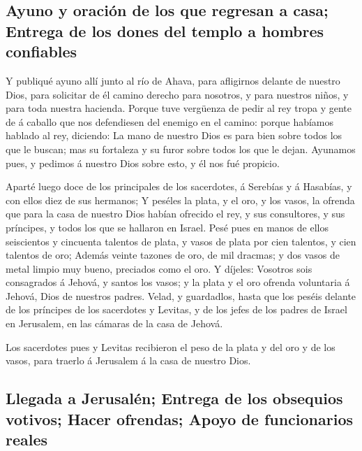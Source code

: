\hypertarget{ayuno-y-oraciuxf3n-de-los-que-regresan-a-casa-entrega-de-los-dones-del-templo-a-hombres-confiables}{%
\subsection{Ayuno y oración de los que regresan a casa; Entrega de los
dones del templo a hombres
confiables}\label{ayuno-y-oraciuxf3n-de-los-que-regresan-a-casa-entrega-de-los-dones-del-templo-a-hombres-confiables}}

 Y publiqué ayuno allí junto al río de Ahava, para
afligirnos delante de nuestro Dios, para solicitar de él camino derecho
para nosotros, y para nuestros niños, y para toda nuestra hacienda.
 Porque tuve vergüenza de pedir al rey tropa y gente de á
caballo que nos defendiesen del enemigo en el camino: porque habíamos
hablado al rey, diciendo: La mano de nuestro Dios es para bien sobre
todos los que le buscan; mas su fortaleza y su furor sobre todos los que
le dejan.  Ayunamos pues, y pedimos á nuestro Dios sobre
esto, y él nos fué propicio.

 Aparté luego doce de los principales de los sacerdotes,
á Serebías y á Hasabías, y con ellos diez de sus hermanos;
 Y peséles la plata, y el oro, y los vasos, la ofrenda
que para la casa de nuestro Dios habían ofrecido el rey, y sus
consultores, y sus príncipes, y todos los que se hallaron en Israel.
 Pesé pues en manos de ellos seiscientos y cincuenta
talentos de plata, y vasos de plata por cien talentos, y cien talentos
de oro;  Además veinte tazones de oro, de mil dracmas; y
dos vasos de metal limpio muy bueno, preciados como el oro.
 Y díjeles: Vosotros sois consagrados á Jehová, y santos
los vasos; y la plata y el oro ofrenda voluntaria á Jehová, Dios de
nuestros padres.  Velad, y guardadlos, hasta que los
peséis delante de los príncipes de los sacerdotes y Levitas, y de los
jefes de los padres de Israel en Jerusalem, en las cámaras de la casa de
Jehová.

 Los sacerdotes pues y Levitas recibieron el peso de la
plata y del oro y de los vasos, para traerlo á Jerusalem á la casa de
nuestro Dios.

\hypertarget{llegada-a-jerusaluxe9n-entrega-de-los-obsequios-votivos-hacer-ofrendas-apoyo-de-funcionarios-reales}{%
\subsection{Llegada a Jerusalén; Entrega de los obsequios votivos; Hacer
ofrendas; Apoyo de funcionarios
reales}\label{llegada-a-jerusaluxe9n-entrega-de-los-obsequios-votivos-hacer-ofrendas-apoyo-de-funcionarios-reales}}

